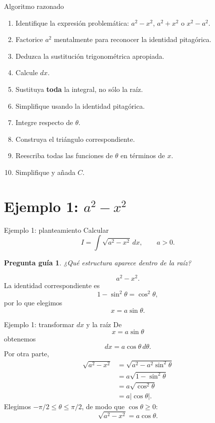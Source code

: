 \documentclass[10pt,aspectratio=169]{beamer}
\newtheorem{pregunta}{Pregunta guía}
\begin{document}
\begin{frame}{Algoritmo razonado}
\begin{enumerate}
\item Identifique la expresión problemática: $a^2-x^2$, $a^2+x^2$ o $x^2-a^2$.
\item Factorice $a^2$ mentalmente para reconocer la identidad pitagórica.
\item Deduzca la sustitución trigonométrica apropiada.
\item Calcule $dx$.
\item Sustituya \textbf{toda} la integral, no sólo la raíz.
\item Simplifique usando la identidad pitagórica.
\item Integre respecto de $\theta$.
\item Construya el triángulo correspondiente.
\item Reescriba todas las funciones de $\theta$ en términos de $x$.
\item Simplifique y añada $C$.
\end{enumerate}
\end{frame}

\section{Ejemplo 1: $a^2-x^2$}
\begin{frame}{Ejemplo 1: planteamiento}
Calcular
\[
\boxed{I=\int\sqrt{a^2-x^2}\,dx},\qquad a>0.
\]
\begin{pregunta}
¿Qué estructura aparece dentro de la raíz?
\end{pregunta}
\[
a^2-x^2.
\]
La identidad correspondiente es
\[
1-\sin^2\theta=\cos^2\theta,
\]
por lo que elegimos
\[
\boxed{x=a\sin\theta}.
\]
\end{frame}

\begin{frame}{Ejemplo 1: transformar $dx$ y la raíz}
De
\[
x=a\sin\theta
\]
obtenemos
\[
\boxed{dx=a\cos\theta\,d\theta}.
\]
Por otra parte,
\begin{align*}
\sqrt{a^2-x^2}
&=\sqrt{a^2-a^2\sin^2\theta}\\
&=a\sqrt{1-\sin^2\theta}\\
&=a\sqrt{\cos^2\theta}\\
&=a|\cos\theta|.
\end{align*}
Elegimos $-\pi/2\le\theta\le\pi/2$, de modo que $\cos\theta\ge0$:
\[
\boxed{\sqrt{a^2-x^2}=a\cos\theta}.
\]
\end{frame}
\end{document}
